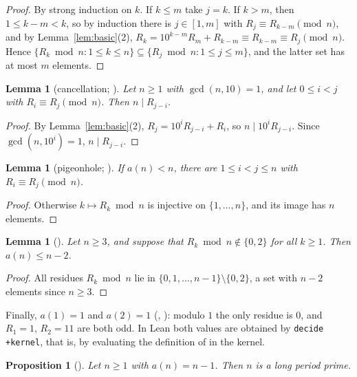 \documentclass[11pt]{amsart}
\theoremstyle{plain}
\newtheorem{lemma}[theorem]{Lemma}
\newtheorem{proposition}[theorem]{Proposition}
\theoremstyle{definition}
\begin{document}
\begin{proof}
By strong induction on $k$. If $k\le m$ take $j=k$. If $k>m$, then $1\le k-m<k$, so by induction there is $j\in[1,m]$ with $R_j\equiv R_{k-m}\pmod n$, and by Lemma~\ref{lem:basic}(2), $R_k=10^{k-m}R_m+R_{k-m}\equiv R_{k-m}\equiv R_j\pmod n$.
Hence $\{R_k\bmod n:1\le k\le n\}\subseteq\{R_j\bmod n:1\le j\le m\}$, and the latter set has at most $m$ elements.
\end{proof}

\begin{lemma}[cancellation; ]\label{lem:cancel}
Let $n\ge1$ with $\gcd(n,10)=1$, and let $0\le i<j$ with $R_i\equiv R_j\pmod n$. Then $n\mid R_{j-i}$.
\end{lemma}

\begin{proof}
By Lemma~\ref{lem:basic}(2), $R_j=10^iR_{j-i}+R_i$, so $n\mid 10^iR_{j-i}$. Since $\gcd(n,10^i)=1$, $n\mid R_{j-i}$.
\end{proof}

\begin{lemma}[pigeonhole; ]\label{lem:pigeon}
If $a(n)<n$, there are $1\le i<j\le n$ with $R_i\equiv R_j\pmod n$.
\end{lemma}

\begin{proof}
Otherwise $k\mapsto R_k\bmod n$ is injective on $\{1,\dots,n\}$, and its image has $n$ elements.
\end{proof}

\begin{lemma}[]\label{lem:miss}
Let $n\ge3$, and suppose that $R_k\bmod n\notin\{0,2\}$ for all $k\ge1$. Then $a(n)\le n-2$.
\end{lemma}

\begin{proof}
All residues $R_k\bmod n$ lie in $\{0,1,\dots,n-1\}\setminus\{0,2\}$, a set with $n-2$ elements since $n\ge3$.
\end{proof}

Finally, $a(1)=1$ and $a(2)=1$ (, ): modulo $1$ the only residue is $0$, and $R_1=1$, $R_2=11$ are both odd. In Lean both values are obtained by \texttt{decide +kernel}, that is, by evaluating the definition of  in the kernel.

\begin{proposition}[]\label{prop:forward}
Let $n\ge1$ with $a(n)=n-1$. Then $n$ is a long period prime.
\end{proposition}
\end{document}
